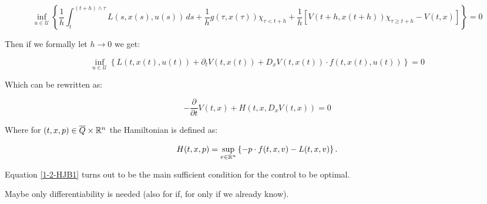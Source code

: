 \begin{equation}
    \inf_{u\in\mathcal{U}}\left\{\frac{1}{h}\int_t^{(t+h)\land\tau} L(s,x(s),u(s))\,ds + \frac{1}{h}g(\tau,x(\tau))\chi_{\tau<t+h} + \frac{1}{h}\left[V(t+h,x(t+h))\chi_{\tau\geq t+h} - V(t,x)\right]\right\}=0
\end{equation}

Then if we formally let $h\to0$ we get:

\[\inf_{u\in\mathcal{U}}\left\{L(t,x(t),u(t)) + \partial_tV(t,x(t)) + D_xV(t,x(t))\cdot f(t,x(t),u(t))\right\}=0\]

Which can be rewritten as:

\begin{equation}\label{1-2-HJB1}
    -\frac{\partial}{\partial t}V(t,x) + H(t,x,D_xV(t,x))=0
\end{equation}

Where for $(t,x,p)\in \overline{Q}\times\mathbb{R}^n$ the Hamiltonian is defined as:

\begin{equation}\label{1-2-Hamiltonian1}
    H(t,x,p) = \sup_{v\in\mathbb{R}^n}\left\{-p\cdot f(t,x,v) - L(t,x,v)\right\}.
\end{equation}

Equation \ref{1-2-HJB1} turns out to be the main sufficient condition for the control to be optimal.

Maybe only differentiability is needed (also for if, for only if we already know).

